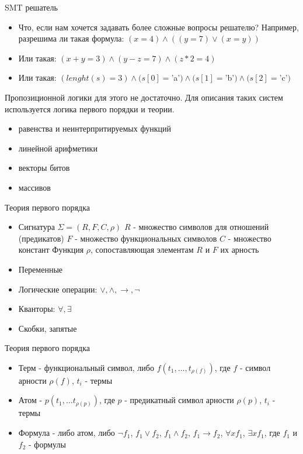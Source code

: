 \documentclass{beamer}
\begin{document}
\begin{frame}{SMT решатель}
\begin{itemize}
\item Что, если нам хочется задавать более сложные вопросы решателю? Например, разрешима ли такая формула:
$(x = 4) \wedge ((y = 7) \vee (x = y))$
\item Или такая: $(x + y = 3) \wedge (y - z = 7) \wedge (z * 2 = 4)$
\item Или такая: $(lenght(s) = 3) \wedge (s[0] = $'a'$) \wedge (s[1] = $'b'$) \wedge (s[2] = $'c'$)$
\end{itemize}
Пропозиционной логики для этого не достаточно. Для описания таких систем используется логика первого порядки и теории.
\begin{itemize}
\item равенства и неинтерпритируемых функций
\item линейной арифметики
\item векторы битов
\item массивов
\end{itemize}
\end{frame}

\begin{frame}{Теория первого порядка}
\begin{itemize}
\item Сигнатура $\Sigma = (R, F, C, \rho)$\newline
$R$ - множество символов для отношений (предикатов)\newline
$F$ - множество функциональных символов\newline
$C$ - множество констант\newline
Функция $\rho$, сопоставляющая элементам $R$ и $F$ их арность
\item Переменные
\item Логические операции: $\vee, \wedge, \rightarrow, \lnot$
\item Кванторы: $\forall, \exists$
\item Скобки, запятые
\end{itemize}
\end{frame}

\begin{frame}{Теория первого порядка}
\begin{itemize}
\item Терм - функциональный символ, либо $f(t_1, \dots, t_{\rho (f)})$, где $f$ - символ арности $\rho (f)$, $t_i$ - термы
\item Атом - $p(t_1, \dots t_{\rho (p)})$, где $p$ - предикатный символ арности $\rho (p)$, $t_i$ - термы
\item Формула - либо атом, либо $\lnot f_1$, $f_1 \vee f_2$, $f_1 \wedge f_2$, $f_1 \rightarrow f_2$, $\forall x f_1$,
$\exists x f_1$, где $f_1$ и $f_2$ - формулы
\end{itemize}
\end{frame}
\end{document}
